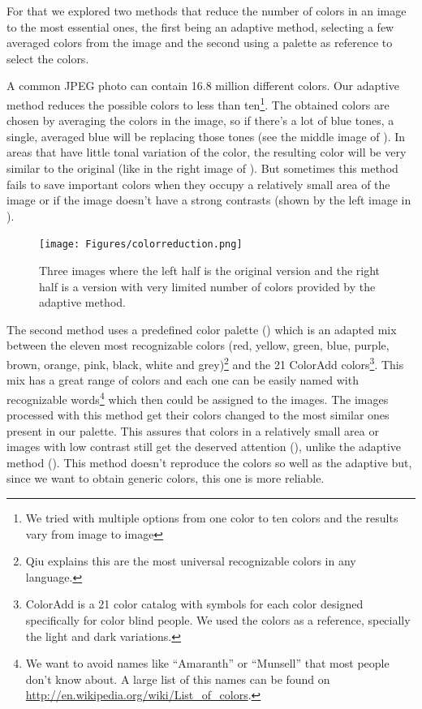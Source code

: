 For that we explored two methods that reduce the number of colors in an image to the most essential ones, the first being an adaptive method, selecting a few averaged colors from the image and the second using a palette as reference to select the colors.

A common JPEG photo can contain 16.8 million different colors. Our adaptive method reduces the possible colors to less than ten\footnote{We tried with multiple options from one color to ten colors and the results vary from image to image}. The obtained colors are chosen by averaging the colors in the image, so if there's a lot of blue tones, a single, averaged blue will be replacing those tones (see the middle image of ). In areas that have little tonal variation of the color, the resulting color will be very similar to the original (like in the right image of ). But sometimes this method fails to save important colors when they occupy a relatively small area of the image or if the image doesn't have a strong contrasts (shown by the left image in ).

\begin{figure}[ht]
	\centering
		\texttt{[image: Figures/colorreduction.png]}
	\caption[Comparison of full color and reduced color images.]{Three images where the left half is the original version and the right half is a version with very limited number of colors provided by the adaptive method.}
	\label{fig:sky}
\end{figure}




The second method uses a predefined color palette () which is an adapted mix between the eleven most recognizable colors (red, yellow, green, blue, purple, brown, orange, pink, black, white and grey)\footnote{Qiu \cite{Qiu:2007p1207} explains this are the most universal recognizable colors in any language.} and the 21 ColorAdd colors\footnote{ColorAdd is a 21 color catalog with symbols for each color designed specifically for color blind people. We used the colors as a reference, specially the light and dark variations.}. This mix has a great range of colors and each one can be easily named with recognizable words\footnote{We want to avoid names like ``Amaranth'' or ``Munsell'' that most people don't know about. A large list of this names can be found on \url{http://en.wikipedia.org/wiki/List_of_colors}.} which then could be assigned to the images. The images processed with this method get their colors changed to the most similar ones present in our palette. This assures that colors in a relatively small area or images with low contrast still get the deserved attention (), unlike the adaptive method (). This method doesn't reproduce the colors so well as the adaptive but, since we want to obtain generic colors, this one is more reliable.


